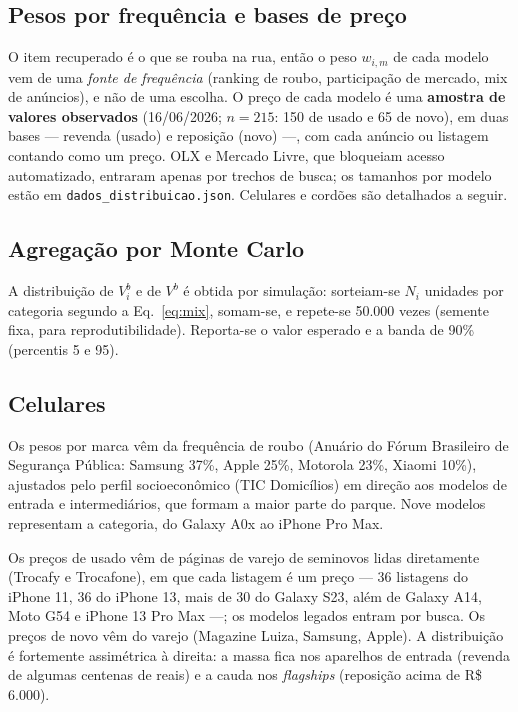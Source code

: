 \documentclass[11pt,a4paper]{article}
\newcommand{\reais}[1]{R\$\,#1}
\begin{document}
\subsection{Pesos por frequência e bases de preço}
O item recuperado é o que se rouba na rua, então o peso $w_{i,m}$ de cada modelo vem de uma
\emph{fonte de frequência} (ranking de roubo, participação de mercado, mix de anúncios), e não de
uma escolha. O preço de cada modelo é uma \textbf{amostra de valores observados} (16/06/2026;
$n=215$: 150 de usado e 65 de novo), em duas bases --- revenda (usado) e reposição (novo) ---, com
cada anúncio ou listagem contando como um preço. OLX e Mercado Livre, que bloqueiam acesso
automatizado, entraram apenas por trechos de busca; os tamanhos por modelo estão em
\texttt{dados\_distribuicao.json}. Celulares e cordões são detalhados a seguir.

\subsection{Agregação por Monte Carlo}\label{sec:mc}
A distribuição de $V_i^b$ e de $V^b$ é obtida por simulação: sorteiam-se $N_i$ unidades por
categoria segundo a Eq.~\eqref{eq:mix}, somam-se, e repete-se 50.000 vezes (semente fixa, para
reprodutibilidade). Reporta-se o valor esperado e a banda de 90\% (percentis 5 e 95).

\subsection{Celulares}
Os pesos por marca vêm da frequência de roubo (Anuário do Fórum Brasileiro de Segurança Pública:
Samsung 37\%, Apple 25\%, Motorola 23\%, Xiaomi 10\%), ajustados pelo perfil socioeconômico (TIC
Domicílios) em direção aos modelos de entrada e intermediários, que formam a maior parte do parque.
Nove modelos representam a categoria, do Galaxy A0x ao iPhone Pro Max.

Os preços de usado vêm de páginas de varejo de seminovos lidas diretamente (Trocafy e Trocafone), em
que cada listagem é um preço --- 36 listagens do iPhone 11, 36 do iPhone 13, mais de 30 do Galaxy
S23, além de Galaxy A14, Moto G54 e iPhone 13 Pro Max ---; os modelos legados entram por busca. Os
preços de novo vêm do varejo (Magazine Luiza, Samsung, Apple). A distribuição é fortemente
assimétrica à direita: a massa fica nos aparelhos de entrada (revenda de algumas centenas de reais)
e a cauda nos \emph{flagships} (reposição acima de \reais{6.000}).
\end{document}
